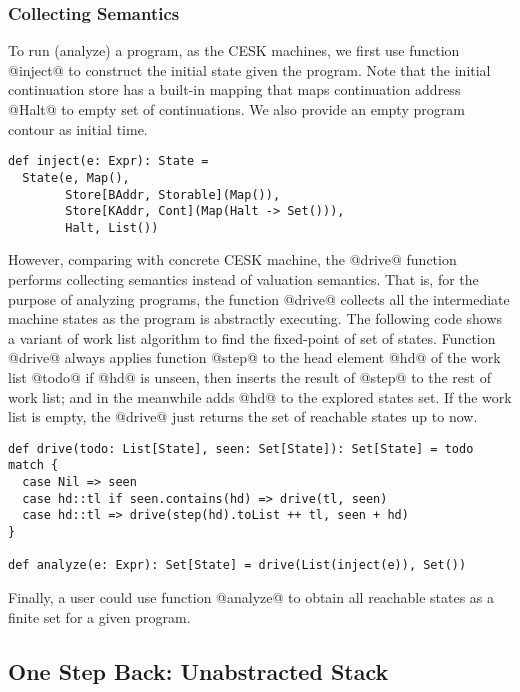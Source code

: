 \documentclass[acmsmall,review,anonymous]{acmart}\settopmatter{printfolios=true,printccs=false,printacmref=false}
\begin{document}
\subsubsection{Collecting Semantics}

To run (analyze) a program, as the CESK machines, we first use function @inject@ to construct
the initial state given the program. 
Note that the initial continuation store has a built-in mapping that maps continuation address
@Halt@ to empty set of continuations.
We also provide an empty program contour as initial time.
\begin{lstlisting}
def inject(e: Expr): State = 
  State(e, Map(), 
        Store[BAddr, Storable](Map()), 
        Store[KAddr, Cont](Map(Halt -> Set())), 
        Halt, List())
\end{lstlisting}

However, comparing with concrete CESK machine, the
@drive@ function performs collecting semantics instead of valuation
semantics. That is, for the purpose of analyzing programs, the function @drive@
collects all the intermediate machine states as the program is abstractly executing.
The following code shows a variant of work list algorithm to find the fixed-point 
of set of states.
Function @drive@ always applies function @step@ to the head element @hd@ of 
the work list @todo@ if @hd@ is unseen, then inserts the result of @step@ to 
the rest of work list; and in the meanwhile adds @hd@ to the explored states set.
If the work list is empty, the @drive@ just returns the set of reachable states 
up to now.

\begin{lstlisting}
def drive(todo: List[State], seen: Set[State]): Set[State] = todo match {
  case Nil => seen
  case hd::tl if seen.contains(hd) => drive(tl, seen)
  case hd::tl => drive(step(hd).toList ++ tl, seen + hd)
}

def analyze(e: Expr): Set[State] = drive(List(inject(e)), Set())
\end{lstlisting}

Finally, a user could use function @analyze@ to obtain all reachable states 
as a finite set for a given program.


\subsection{One Step Back: Unabstracted Stack}
\end{document}
